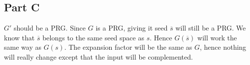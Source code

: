 \documentclass{article}
\begin{document}
        \subsection*{Part C}
            $G'$ should be a PRG. Since $G$ is a PRG, giving it seed $\overline{s}$ will still be a PRG. We know that $\overline{s}$ belongs to the same seed space as $s$. Hence $G(\overline{s})$ will work the same way as $G(s)$. The expansion factor will be the same as $G$, hence nothing will really change except that the input will be complemented.
\end{document}
